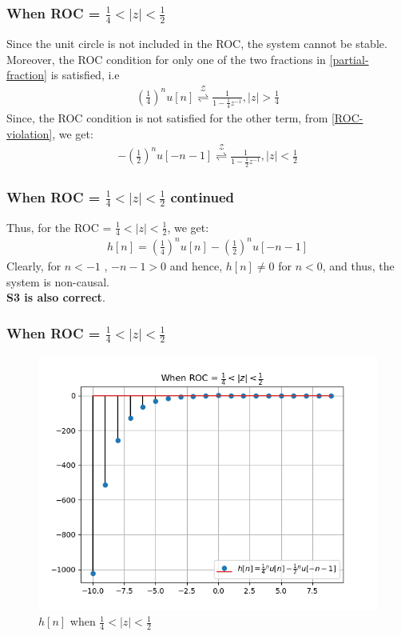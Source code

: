 \documentclass{beamer}
\providecommand{\brak}[1]{\ensuremath{\left(#1\right)}}
\providecommand{\ztrans}{\overset{\mathcal{Z}}{ \rightleftharpoons}}
\providecommand{\abs}[1]{\left\vert#1\right\vert}
\begin{document}
\begin{frame}
    \frametitle{When ROC = $\frac{1}{4} < \abs{z} < \frac{1}{2}$}
    \begin{flushleft}
    Since the unit circle is not included in the ROC, the system cannot be stable. Moreover, the ROC condition for only one of the two fractions in \eqref{partial-fraction} is satisfied, i.e
 \begin{align}
     \brak{\frac{1}{4}}^nu[n]\ztrans \frac{1}{1 - \frac{1}{4}z^{-1}}  , \abs{z} > \frac{1}{4}
 \end{align}
 Since, the ROC condition is not satisfied for the other term, from \eqref{ROC-violation}, we get:
 \begin{align}
    -\brak{\frac{1}{2}}^nu[-n-1] \ztrans \frac{1}{1 - \frac{1}{2}z^{-1}} , \abs{z} < \frac{1}{2}
 \end{align}
    \end{flushleft}
\end{frame}

\begin{frame}
    \frametitle{When ROC = $\frac{1}{4} < \abs{z} < \frac{1}{2}$ continued}
    \begin{flushleft}
   Thus, for the ROC = $\frac{1}{4} < \abs{z} < \frac{1}{2}$, we get:
 \begin{align}
     h[n] = \brak{\frac{1}{4}}^nu[n]  -\brak{\frac{1}{2}}^{n} u[-n-1] 
 \end{align}
 Clearly, for $n<-1$ , $-n-1 > 0$ and hence, $h[n] \neq 0$ for $n<0$, and thus, the system is non-causal.\\
\textbf{S3 is also correct}.\\
    \end{flushleft}
\end{frame}

\begin{frame}
    \frametitle{When ROC = $\frac{1}{4} < \abs{z} < \frac{1}{2}$}
    \begin{flushleft}
    \begin{figure}[!ht]
\centering
 \includegraphics[width=\columnwidth]{graphs/S3.png}
 \caption{$h[n]$ when $\frac{1}{4}<\abs{z} < \frac{1}{2}$}
 \end{figure}
    \end{flushleft}
\end{frame}
\end{document}
